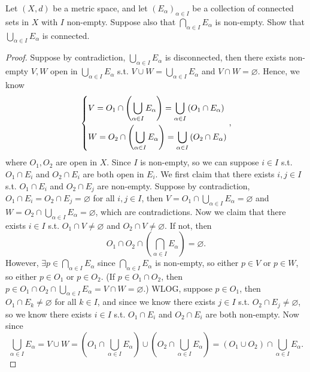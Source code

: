 \begin{problem}[15pts]
    Let $(X,d)$ be a metric space, and let $(E_\alpha)_{\alpha\in I}$ be a collection of connected sets in $X$ with $I$ non-empty.  
Suppose also that $\bigcap_{\alpha\in I} E_\alpha$ is non-empty.  
Show that $\bigcup_{\alpha\in I} E_\alpha$ is connected.
\end{problem}
\begin{proof}
    Suppose by contradiction, \(\bigcup_{\alpha \in I} E_\alpha  \) is disconnected, then there exists non-empty \(V, W\) open in \(\bigcup_{\alpha \in I} E_\alpha  \) s.t. \(V \cup W = \bigcup_{\alpha \in I} E_\alpha  \) and \(V \cap W = \varnothing \). Hence, we know 
    \[
        \begin{dcases}
            V = O_1 \cap \left( \bigcup_{\alpha \in I} E_\alpha   \right) = \bigcup_{\alpha \in I} \left( O_1 \cap E_\alpha  \right) \\
            W = O_2 \cap \left( \bigcup_{\alpha \in I} E_\alpha   \right) = \bigcup_{\alpha \in I} \left( O_2 \cap E_\alpha  \right)  
        \end{dcases},
    \] where \(O_1, O_2\) are open in \(X\). Since \(I\) is non-empty, so we can suppose \(i \in I\) s.t. \(O_1 \cap E_i\) and \(O_2 \cap E_i\) are both open in \(E_i\). We first claim that there exists \(i, j \in I\) s.t. \(O_1 \cap E_i\) and \(O_2 \cap E_j\) are non-empty. Suppose by contradiction, \(O_1 \cap E_i = O_2 \cap E_j = \varnothing \) for all \(i, j \in I\), then \(V = O_1 \cap \bigcup_{\alpha \in I} E_\alpha  = \varnothing  \) and \(W = O_2 \cap \bigcup_{\alpha \in I} E_\alpha = \varnothing  \), which are contradictions. Now we claim that there exists \(i \in I\) s.t. \(O_1 \cap V \neq \varnothing \) and \(O_2 \cap V \neq \varnothing \). If not, then 
    \[
        O_1 \cap O_2 \cap \left( \bigcap_{\alpha \in I} E_\alpha   \right) = \varnothing. 
    \]
    However, \(\exists p \in \bigcap_{\alpha \in I} E_\alpha \) since \(\bigcap_{\alpha \in I} E_\alpha\) is non-empty, so either \(p \in V\) or \(p \in W\), so either \(p \in O_1\) or \(p \in O_2\). (If \(p \in O_1 \cap O_2\), then \(p \in O_1 \cap O_2 \cap \bigcup_{\alpha \in I} E_\alpha  = V \cap W = \varnothing \).) WLOG, suppose \(p \in O_1\), then \(O_1 \cap E_k \neq \varnothing \) for all \(k \in I\), and since we know there exists \(j \in I\) s.t. \(O_2 \cap E_j \neq \varnothing \), so we know there exists \(i \in I\) s.t. \(O_1 \cap E_i\) and \(O_2 \cap E_i\) are both non-empty.           
    Now since 
    \[
        \bigcup_{\alpha \in I} E_\alpha = V \cup W = \left( O_1 \cap \bigcup_{\alpha \in I} E_\alpha \right) \cup \left( O_2 \cap \bigcup_{\alpha \in I} E_\alpha \right) = (O_1 \cup O_2) \cap \bigcup_{\alpha \in I} E_\alpha.  
\]
\end{proof}
